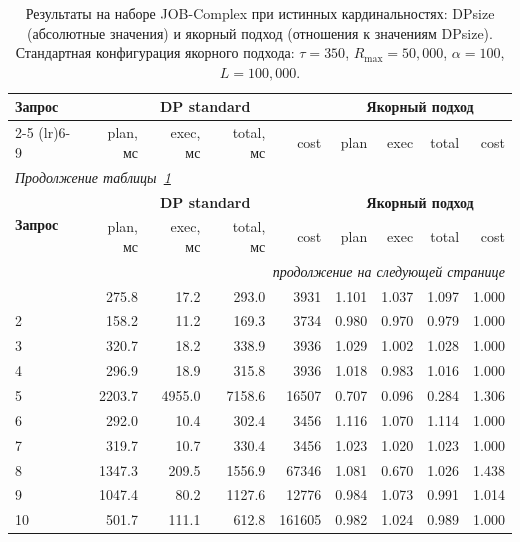 \clearpage
\begin{center}
\footnotesize
\setlength{\tabcolsep}{4pt}
\renewcommand{\arraystretch}{1.1}
\begin{longtable}{@{}l@{\hspace{6pt}}rrrr@{\hspace{8pt}}rrrr@{}}
\caption{Результаты на наборе JOB-Complex при истинных кардинальностях: DPsize (абсолютные значения) и якорный подход (отношения к значениям DPsize). Стандартная конфигурация якорного подхода: $\tau{=}350$, $R_{\max}{=}50{,}000$, $\alpha{=}100$, $L{=}100{,}000$.}\label{tab:appB-cpx} \\
\toprule
\multirow{2}{*}{\textbf{Запрос}} & \multicolumn{4}{c}{\textbf{DP standard}} & \multicolumn{4}{c}{\textbf{Якорный подход}} \\
\cmidrule(lr){2-5} \cmidrule(lr){6-9}
 & plan, мс & exec, мс & total, мс & cost & plan & exec & total & cost \\
\midrule
\endfirsthead
\multicolumn{9}{l}{\textit{Продолжение таблицы~\ref{tab:appB-cpx}}} \\
\toprule
\multirow{2}{*}{\textbf{Запрос}} & \multicolumn{4}{c}{\textbf{DP standard}} & \multicolumn{4}{c}{\textbf{Якорный подход}} \\
\cmidrule(lr){2-5} \cmidrule(lr){6-9}
 & plan, мс & exec, мс & total, мс & cost & plan & exec & total & cost \\
\midrule
\endhead
\midrule
\multicolumn{9}{r}{\textit{продолжение на следующей странице}} \\
\endfoot
\bottomrule
\endlastfoot
1 & 275.8 & 17.2 & 293.0 & 3931 & 1.101 & 1.037 & 1.097 & 1.000 \\
2 & 158.2 & 11.2 & 169.3 & 3734 & 0.980 & 0.970 & 0.979 & 1.000 \\
3 & 320.7 & 18.2 & 338.9 & 3936 & 1.029 & 1.002 & 1.028 & 1.000 \\
4 & 296.9 & 18.9 & 315.8 & 3936 & 1.018 & 0.983 & 1.016 & 1.000 \\
5 & 2203.7 & 4955.0 & 7158.6 & 16507 & 0.707 & 0.096 & 0.284 & 1.306 \\
6 & 292.0 & 10.4 & 302.4 & 3456 & 1.116 & 1.070 & 1.114 & 1.000 \\
7 & 319.7 & 10.7 & 330.4 & 3456 & 1.023 & 1.020 & 1.023 & 1.000 \\
8 & 1347.3 & 209.5 & 1556.9 & 67346 & 1.081 & 0.670 & 1.026 & 1.438 \\
9 & 1047.4 & 80.2 & 1127.6 & 12776 & 0.984 & 1.073 & 0.991 & 1.014 \\
10 & 501.7 & 111.1 & 612.8 & 161605 & 0.982 & 1.024 & 0.989 & 1.000 \\

\end{longtable}
\end{center}
